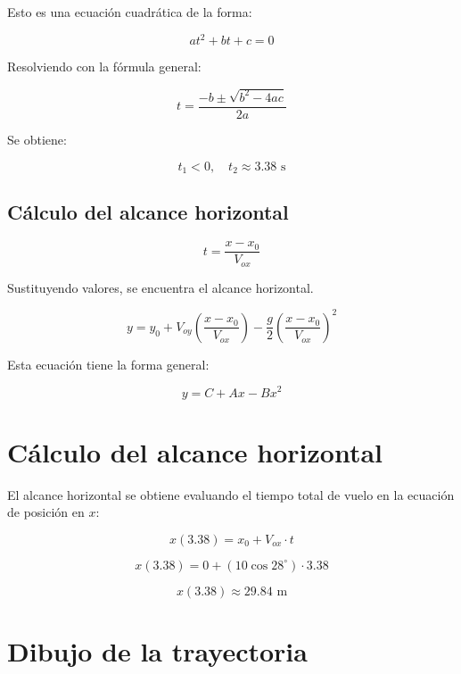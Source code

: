 Esto es una ecuación cuadrática de la forma:

\[
at^2 + bt + c = 0
\]

Resolviendo con la fórmula general:

\[
t = \frac{-b \pm \sqrt{b^2 - 4ac}}{2a}
\]

Se obtiene:

\[
t_1 < 0, \quad t_2 \approx 3.38 \text{ s}
\]

\subsection*{Cálculo del alcance horizontal}

\[
t = \frac{x - x_0}{V_{ox}}
\]

Sustituyendo valores, se encuentra el alcance horizontal.


\[
y = y_0 + V_{oy} \left( \frac{x - x_0}{V_{ox}} \right) - \frac{g}{2} \left( \frac{x - x_0}{V_{ox}} \right)^2
\]

Esta ecuación tiene la forma general:

\[
y = C + A x - B x^2
\]

\section*{Cálculo del alcance horizontal}

El alcance horizontal se obtiene evaluando el tiempo total de vuelo en la ecuación de posición en $x$:

\[
x(3.38) = x_0 + V_{ox} \cdot t
\]

\[
x(3.38) = 0 + (10 \cos 28^\circ) \cdot 3.38
\]

\[
x(3.38) \approx 29.84 \text{ m}
\]

\section*{Dibujo de la trayectoria}

\begin{center}
\end{center}

